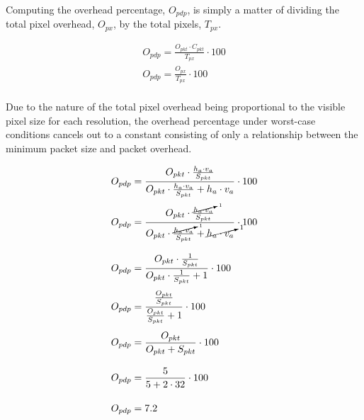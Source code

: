     Computing the overhead percentage, $O_{pdp}$, is simply a matter of dividing the total pixel overhead, $O_{px}$, by the total pixels, $T_{px}$.

    \begin{equation}
        \begin{array}{ l }
            \displaystyle O_{pdp}=\frac{O_{pkt}\cdot C_{pkt}}{T_{px}} \cdot 100 \\[13pt]
            \displaystyle O_{pdp}=\frac{O_{px}}{T_{px}} \cdot 100 \\[13pt]
        \end{array}
        \label{eq:overhead}
    \end{equation}

    Due to the nature of the total pixel overhead being proportional to the visible pixel size for each resolution, the overhead percentage under worst-case conditions cancels out to a constant consisting of only a relationship between the minimum packet size and packet overhead.

    \begin{equation}
        \begin{array}{ l }
            \displaystyle O_{pdp}=\frac{O_{pkt}\cdot \frac{h_a \cdot v_a}{S_{pkt}}}{O_{pkt} \cdot \frac{h_a \cdot v_a}{S_{pkt}} + h_a \cdot v_a} \cdot 100 \\[16pt]
            \displaystyle O_{pdp}=\frac{O_{pkt}\cdot \frac{\cancelto{1}{h_a \cdot v_a}}{S_{pkt}}}{O_{pkt} \cdot \frac{\cancelto{1}{h_a \cdot v_a}}{S_{pkt}} + \cancelto{1}{h_a \cdot v_a}} \cdot 100 \\[25pt]
            \displaystyle O_{pdp}=\frac{O_{pkt}\cdot \frac{1}{S_{pkt}}}{O_{pkt} \cdot \frac{1}{S_{pkt}} + 1} \cdot 100 \\[16pt]
            \displaystyle O_{pdp}=\frac{\frac{O_{pkt}}{S_{pkt}}}{\frac{O_{pkt}}{S_{pkt}} + 1} \cdot 100 \\[19pt]
            \displaystyle O_{pdp}=\frac{O_{pkt}}{O_{pkt}+S_{pkt}} \cdot 100 \\[19pt]
            \displaystyle O_{pdp}=\frac{5}{5 + 2 \cdot 32} \cdot 100 \\[19pt]
            \displaystyle O_{pdp}=7.2 \\[13pt]
        \end{array}
        \label{eq:cancel}
    \end{equation}

